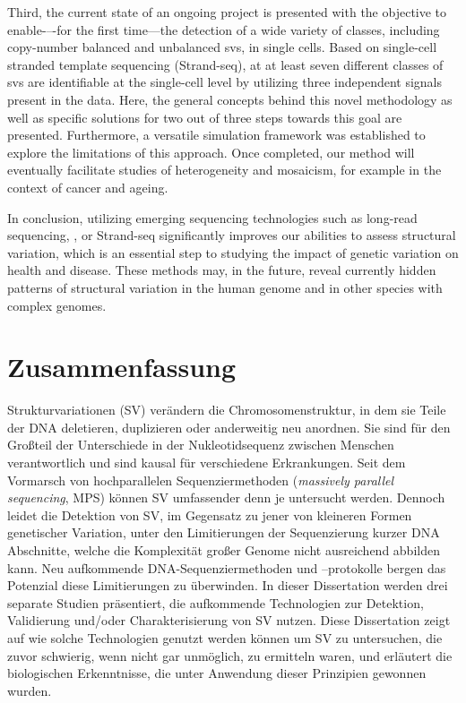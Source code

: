 Third, the current state of an ongoing project is presented with the objective
to enable-–-for the first time---the detection of a wide variety of \sv classes,
including copy-number balanced and unbalanced \acp{sv}, in single cells. Based on
single-cell stranded template sequencing (Strand-seq), at at least seven different
classes of \acp{sv} are identifiable at the single-cell level by utilizing three
independent signals present in the data. Here, the general concepts behind this
novel methodology as well as specific solutions for two out of
three steps towards this goal are presented. Furthermore, a versatile simulation
framework was established to explore the limitations of this approach.
Once completed, our method will eventually facilitate studies of \sv
heterogeneity and mosaicism, for example in the context of cancer and ageing.

In conclusion, utilizing emerging sequencing technologies such as long-read
sequencing, \hic, or Strand-seq significantly improves our abilities to assess
structural variation, which is an essential step to studying the impact of
genetic variation on health and disease. These methods may, in
the future, reveal currently hidden patterns of structural variation in the
human genome and in other species with complex genomes.




\cleardoublepage
{}
\chapter*{Zusammenfassung}%
%

Strukturvariationen (SV) verändern die Chromosomenstruktur, in dem sie
Teile der DNA deletieren, duplizieren oder anderweitig neu anordnen. Sie sind für
den Großteil der Unterschiede in der Nukleotidsequenz zwischen Menschen verantwortlich
und sind kausal für verschiedene Er\-kran\-kun\-gen. Seit dem Vormarsch
von hochparallelen Sequenziermethoden (\textit{massively parallel sequencing},
MPS) können SV umfassender denn je untersucht werden. Dennoch leidet die Detektion von
SV, im Gegensatz zu jener von kleineren Formen genetischer Variation, unter den
Limitierungen der Sequenzierung kurzer DNA Abschnitte, welche die Komplexität
großer Genome nicht ausreichend abbilden kann. Neu aufkommende
DNA-Se\-quen\-zier\-me\-tho\-den und –protokolle bergen das Potenzial diese Limitierungen
zu überwinden. In dieser Dissertation werden drei separate Studien präsentiert,
die aufkommende Technologien zur Detektion, Validierung und/oder Charakterisierung
von SV nutzen. Diese Dissertation zeigt auf wie solche Technologien genutzt
werden können um SV zu untersuchen, die zuvor schwierig, wenn nicht gar
unmöglich, zu ermitteln waren, und erläutert die biologischen Erkenntnisse, die
unter Anwendung dieser Prinzipien gewonnen wurden.

